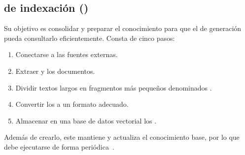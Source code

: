 \subsection{ de indexación ()}
Su objetivo es consolidar y preparar el conocimiento para que el  de generación pueda consultarlo eficientemente. Consta de cinco pasos:
\begin{enumerate}
\tightlist
	\item Conectarse a las fuentes externas.
	\item Extraer y  los documentos.
	\item Dividir textos largos en fragmentos más pequeños denominados .
	\item Convertir los  a un formato adecuado.
	\item Almacenar en una base de datos vectorial los .
\end{enumerate}
Además de crearlo, este  mantiene y actualiza el conocimiento base, por lo que debe ejecutarse de forma periódica~\cite{book:RAG_SimpleGuide}.

